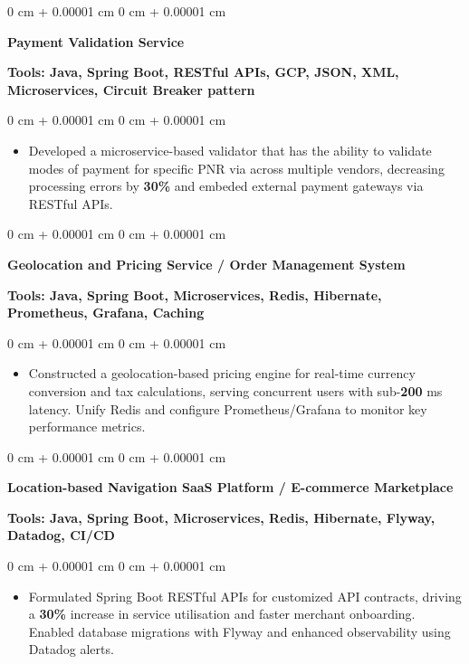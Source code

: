 \documentclass[10pt, letterpaper]{article}
\newenvironment{highlights}{
    \begin{itemize}[
        topsep=0.10 cm,
        parsep=0.10 cm,
        partopsep=0pt,
        itemsep=0pt,
        leftmargin=0 cm + 10pt
    ]
}{
    \end{itemize}
} %
\newenvironment{onecolentry}{
    \begin{adjustwidth}{
        0 cm + 0.00001 cm
    }{
        0 cm + 0.00001 cm
    }
}{
    \end{adjustwidth}
} %
\begin{document}
        \vspace{0.1 cm}
        \begin{onecolentry}
            \textbf{Payment Validation Service}
        \end{onecolentry}
        \textbf{Tools: Java, Spring Boot, RESTful APIs, GCP, JSON, XML, Microservices, Circuit Breaker pattern}
        
        \vspace{0.10 cm}
        \begin{onecolentry}
            \begin{highlights}
                \item Developed a microservice-based validator that has the ability to validate modes of payment for specific PNR via across multiple vendors, decreasing processing errors by \textbf{30\%} and embeded external payment gateways via RESTful APIs.
            \end{highlights}
        \end{onecolentry}
        
        \vspace{0.1 cm}
        \begin{onecolentry}
            \textbf{Geolocation and Pricing Service / Order Management System}
        \end{onecolentry}
        \textbf{Tools: Java, Spring Boot, Microservices, Redis, Hibernate, Prometheus, Grafana, Caching}
        \vspace{0.10 cm}
        \begin{onecolentry}
            \begin{highlights}
                \item Constructed a geolocation-based pricing engine for real-time currency conversion and tax calculations, serving concurrent users with sub-\textbf{200} ms latency. Unify Redis and configure Prometheus/Grafana to monitor key performance metrics.
            \end{highlights}
        \end{onecolentry}

        \vspace{0.1 cm}

        \begin{onecolentry}
            \textbf{Location-based Navigation SaaS Platform / E-commerce Marketplace}
        \end{onecolentry}
        \textbf{Tools: Java, Spring Boot, Microservices, Redis, Hibernate, Flyway, Datadog, CI/CD}
        \vspace{0.10 cm}
        \begin{onecolentry}
            \begin{highlights}
                \item Formulated Spring Boot RESTful APIs for customized API contracts, driving a \textbf{30\%} increase in service utilisation and faster merchant onboarding. Enabled database migrations with Flyway and enhanced observability using Datadog alerts.
                
            \end{highlights}
        \end{onecolentry}
    
\end{document}
